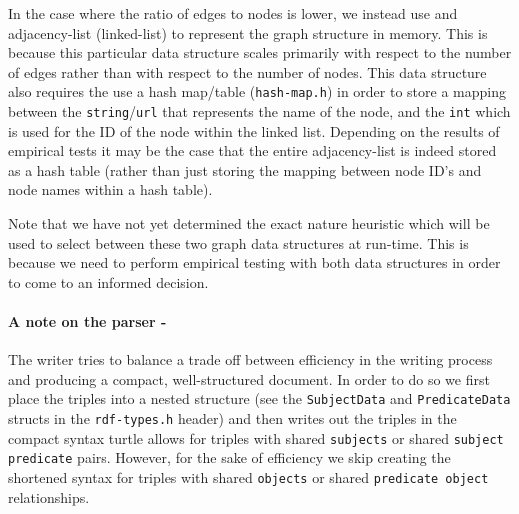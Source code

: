 \documentclass{article}
\begin{document}
In the case where the ratio of edges to nodes is lower, we instead use and adjacency-list (linked-list) to represent the graph structure in memory. This is because this particular data structure scales primarily with respect to the number of edges rather than with respect to the number of nodes. This data structure also requires the use a hash map/table (\texttt{hash-map.h}) in order to store a mapping between the \texttt{string}/\texttt{url} that represents the name of the node, and the \texttt{int} which is used for the ID of the node within the linked list. Depending on the results of empirical tests it may be the case that the entire adjacency-list is indeed stored as a hash table (rather than just storing the mapping between node ID's and node names within a hash table).



Note that we have not yet determined the exact nature heuristic which will be used to select between these two graph data structures at run-time. This is because we need to perform empirical testing with both data structures in order to come to an informed decision.


\paragraph{A note on the  parser - }
The writer tries to balance a trade off between efficiency in the writing process and producing a compact, well-structured document. In order to do so we first place the triples into a nested structure (see the \texttt{SubjectData} and \texttt{PredicateData} structs in the \texttt{rdf-types.h} header) and then writes out the triples in the compact syntax turtle allows for triples with shared \texttt{subjects} or shared \texttt{subject predicate} pairs. However, for the sake of efficiency we skip creating the shortened syntax for triples with shared \texttt{objects} or shared \texttt{predicate object} relationships.




\end{document}
